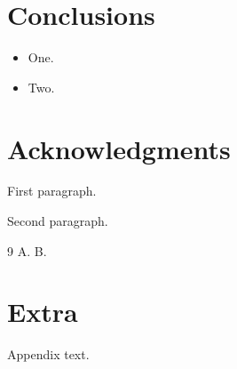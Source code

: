\documentclass{article}
\begin{document}
\section{Conclusions}
\begin{itemize}
\item One.
\itemize
\item Two.
\end{itemize}
\section*{Acknowledgments}
First paragraph.

Second paragraph.
\begin{thebibliography}{9}
 A.
 B.
\end{thebibliography}
\appendix
\section{Extra}
Appendix text.
\end{document}
